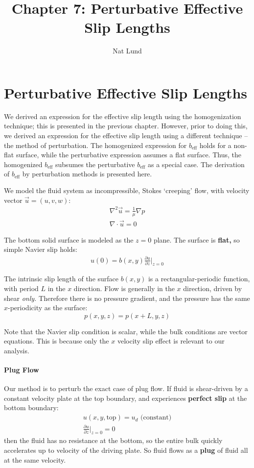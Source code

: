 \documentclass[12pt, a4paper, twoside, openright]{book}
\title{Chapter 7: Perturbative Effective Slip Lengths}
\author{Nat Lund}
\newcommand{\beff}{\ensuremath{b_{\mathrm{eff}}}}
\begin{document}
\chapter{Perturbative Effective Slip Lengths}

We derived an expression for the effective slip length using the homogenization technique; this is presented in the previous chapter.  However, prior to doing this, we derived an expression for the effective slip length using a different technique -- the method of perturbation.  The homogenized expression for $\beff$ holds for a non-flat surface, while the perturbative expression assumes a flat surface.  Thus, the homogenized $\beff$ subsumes the perturbative $\beff$ as a special case.  The derivation of $\beff$ by perturbation methods is presented here.

\vspace{1em}

We model the fluid system as incompressible, Stokes `creeping' flow, with velocity vector $\vec{u} = (u,v,w)$: 
\begin{gather}
\nabla^2 \vec{u} = \frac{1}{\mu} \nabla p  \\
\nabla \cdot \vec{u} = 0
\end{gather}

The bottom solid surface is modeled as the $z=0$ plane.  
The surface is \textbf{flat,} so simple Navier slip holds:
\begin{gather}
u(0) = b(x,y) \frac{\partial u}{\partial z} \rvert_{z=0}
\end{gather}

The intrinsic slip length of the surface $b(x,y)$ is a rectangular-periodic function, with period $L$ in the $x$ direction.
Flow is generally in the $x$ direction, driven by shear \emph{only.}  Therefore there is no pressure gradient, and the pressure has the same $x$-periodicity as the surface:
\begin{equation}
p(x,y,z) = p(x+L,y,z)
\end{equation}


Note that the Navier slip condition is scalar, while the bulk conditions are vector equations.  This is because only the $x$ velocity slip effect is relevant to our analysis.



\subsubsection*{Plug Flow}

Our method is to perturb the exact case of plug flow.  If fluid is shear-driven by a constant velocity plate at the top boundary, and experiences \textbf{perfect slip} at the bottom boundary:
\begin{gather}
u(x,y,\mathrm{top}) = u_d \text{  (constant)} \\
\frac{\partial u}{\partial z} \rvert_{z=0} = 0
\end{gather}
then the fluid has no resistance at the bottom, so the entire bulk quickly accelerates up to velocity of the driving plate.  So fluid flows as a \textbf{plug} of fluid all at the same velocity.
\end{document}
